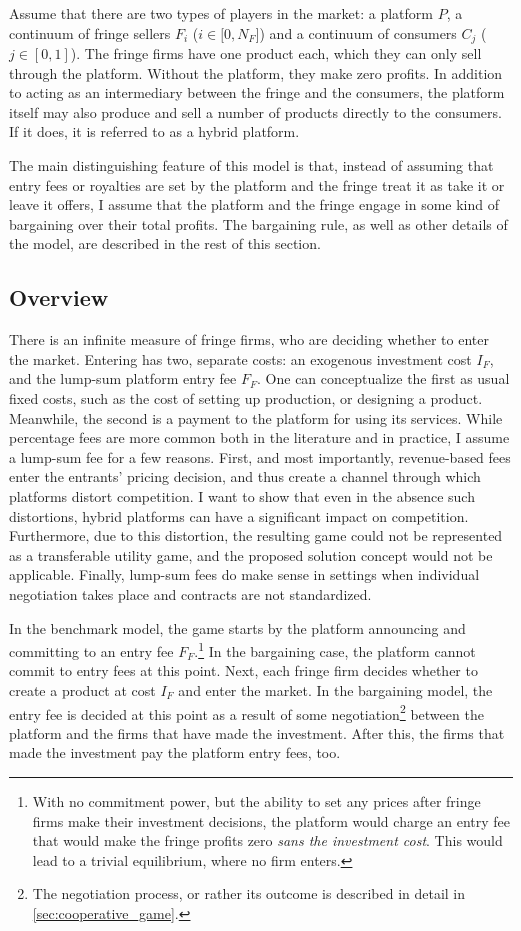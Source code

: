 \documentclass[a4paper]{article}
\begin{document}
Assume that there are two types of players in the market: a platform $P$, a continuum of fringe sellers $F_i$ ($i \in [0, N_F$]) and a continuum of consumers $C_j$ ($j \in [0, 1]$).
The fringe firms have one product each, which they can only sell through the platform.
Without the platform, they make zero profits.
In addition to acting as an intermediary between the fringe and the consumers, the platform itself may also produce and sell a number of products directly to the consumers.
If it does, it is referred to as a hybrid platform.

The main distinguishing feature of this model is that, instead of assuming that entry fees or royalties are set by the platform and the fringe treat it as take it or leave it offers, I assume that the platform and the fringe engage in some kind of bargaining over their total profits.
The bargaining rule, as well as other details of the model, are described in the rest of this section.


\subsection{Overview}

There is an infinite measure of fringe firms, who are deciding whether to enter the market.
Entering has two, separate costs: an exogenous investment cost $I_F$, and the lump-sum platform entry fee $F_F$.
One can conceptualize the first as usual fixed costs, such as the cost of setting up production, or designing a product.
Meanwhile, the second is a payment to the platform for using its services.
While percentage fees are more common both in the literature and in practice, I assume a lump-sum fee for a few reasons.
First, and most importantly, revenue-based fees enter the entrants' pricing decision, and thus create a channel through which platforms distort competition.
I want to show that even in the absence such distortions, hybrid platforms can have a significant impact on competition.
Furthermore, due to this distortion, the resulting game could not be represented as a transferable utility game, and the proposed solution concept would not be applicable.
Finally, lump-sum fees do make sense in settings when individual negotiation takes place and contracts are not standardized.

In the benchmark model, the game starts by the platform announcing and committing to an entry fee $F_F$.\footnote{
    With no commitment power, but the ability to set any prices after fringe firms make their investment decisions, the platform would charge an entry fee that would make the fringe profits zero \emph{sans the investment cost}.
    This would lead to a trivial equilibrium, where no firm enters.
}
In the bargaining case, the platform cannot commit to entry fees at this point.
Next, each fringe firm decides whether to create a product at cost $I_F$ and enter the market.
In the bargaining model, the entry fee is decided at this point as a result of some negotiation\footnote{
    The negotiation process, or rather its outcome is described in detail in \cref{sec:cooperative_game}.
} between the platform and the firms that have made the investment.
After this, the firms that made the investment pay the platform entry fees, too.
\end{document}
